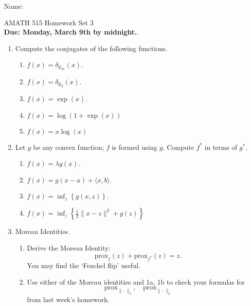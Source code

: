 \documentclass[11pt]{amsart}
\begin{document}
{\Large Name:}  \\
\begin{center}
\Large AMATH 515 \hskip 2in Homework Set 3\\
{\bf Due: Monday, March 9th by midnight.}. 
\end{center}
\bigskip
\begin{enumerate}

\item  Compute the conjugates of the following functions.  
\begin{enumerate}
\item $f(x) = \delta_{\mathbb{B}_{\infty}}(x)$.
\item $f(x) = \delta_{\mathbb{B}_{2}}(x)$.
\item $f(x) = \exp(x)$.
\item $f(x) =  \log(1+\exp(x))$
\item $f(x) = x\log(x)$
\end{enumerate}


\bigskip\bigskip



\item  Let $g$ be any convex function; $f$ is formed using $g$.
Compute $f^*$ in terms of $g^*$.  
\begin{enumerate}
\item $f(x) = \lambda g(x)$.
\item $f(x) = g(x-a) + \langle x, b \rangle$.
\item $f(x) = \inf_z \left\{g(x,z)\right\}$. 
\item $f(x) = \inf_z \left\{\frac{1}{2}\|x-z\|^2 + g(z)\right\}$
\end{enumerate}

\bigskip\bigskip

\item Moreau Identities.
\begin{enumerate}
\item  Derive the Moreau Identity: 
\[
\mbox{prox}_{f}(z) + \mbox{prox}_{f^*}(z) = z. 
\]
You may find the `Fenchel flip' useful. 

\bigskip \bigskip


\bigskip \bigskip

\item Use either of the Moreau identities and 
1a, 1b to check your formulas for 
\[
\mbox{prox}_{\|\cdot\|_1}, \quad \mbox{prox}_{\|\cdot\|_2}
\]
from last week's homework. 
\end{enumerate}




\end{enumerate}
\end{document}
